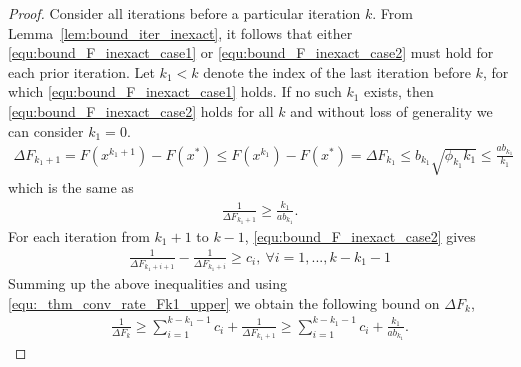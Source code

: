 \documentclass[11pt]{article}
\numberwithin{equation}{section}
\begin{document}
\begin{proof}
Consider all iterations before a particular iteration $k$.  From Lemma~\ref{lem:bound_iter_inexact}, it follows that either \eqref{equ:bound_F_inexact_case1} or \eqref{equ:bound_F_inexact_case2} must hold for each prior iteration.
       Let $k_1 <k$  denote the index of the last iteration before $k$,  for which \eqref{equ:bound_F_inexact_case1} holds. If no such $k_1$ exists, then \eqref{equ:bound_F_inexact_case2} holds for all $k$ and without loss of generality we can consider $k_1=0$.
	 \begin{align}
	\label{equ:_thm_conv_rate_case1}
	    \Delta F_{k_1+1}=F(x^{k_1+1}) - F(x^*) \leq   F(x^{k_1}) - F(x^*) =\Delta F_{k_1} \leq b_{k_1} \sqrt{\phi_{k_1}k_1} \leq  \frac {a b_{k_1}}{k_1}
	\end{align}
	which is the same as
		 \begin{align}\label{equ:_thm_conv_rate_Fk1_upper}
	  \frac{1}{\Delta F_{k_1+1}} \geq  \frac{k_1} {a b_{k_1}}.
	  \end{align}
	  For each iteration from  $k_1+1$ to $k-1$, \eqref{equ:bound_F_inexact_case2}  gives 
	\begin{align*}
	    \frac{1}{\Delta F_{k_1 + i + 1}} - \frac{1}{\Delta F_{k_1 + i}} \geq c_i, ~\forall i = 1, ..., k-k_1-1
	\end{align*}
	Summing up the above inequalities  and using \eqref{equ:_thm_conv_rate_Fk1_upper} we obtain the following bound on 
	$\Delta F_{k}$, 
	\begin{align}\label{eq:finalsum}
	    \frac{1}{\Delta F_{k }} \geq \sum_{i=1}^{k-k_1-1}c_i+  \frac{1}{\Delta F_{k_1 + 1}} \geq  
	    \sum_{i=1}^{k-k_1-1}c_i+ \frac{k_1} {a b_{k_1} }.
	\end{align}
	

\end{proof}
\end{document}
